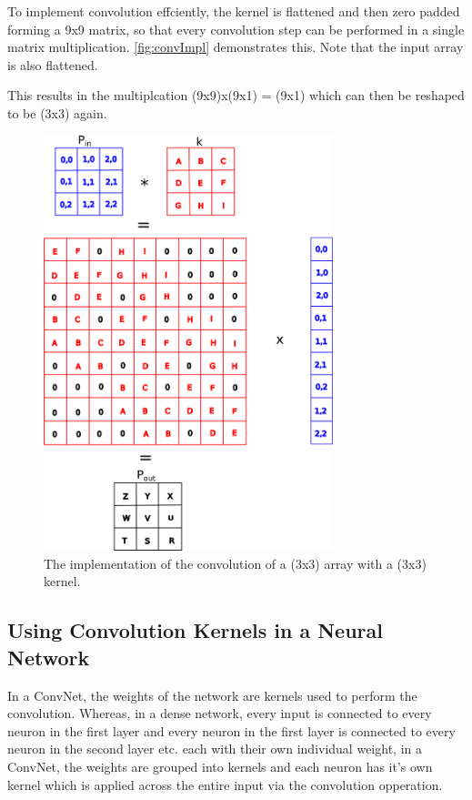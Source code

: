 To implement convolution effciently, the kernel is flattened and then zero padded forming a 9x9 matrix, so that every convolution step can be performed in a single matrix multiplication. \autoref{fig:convImpl} demonstrates this. Note that the input array is also flattened. 

This results in the multiplcation (9x9)x(9x1) = (9x1) which can then be reshaped to be (3x3) again.

\begin{figure}
	\centering	\includegraphics[width=0.75\textwidth]{Figs/intro2dl/convolutionImplementation.png}
	\caption{The implementation of the convolution of a (3x3) array with a (3x3) kernel.}
	\label{fig:convImpl}
\end{figure}

\subsection{Using Convolution Kernels in a Neural Network}
In a ConvNet, the weights of the network are kernels used to perform the convolution. Whereas, in a dense network, every input is connected to every neuron in the first layer and every neuron in the first layer is connected to every neuron in the second layer etc. each with their own individual weight, in a ConvNet, the weights are grouped into kernels and each neuron has it's own kernel which is applied across the entire input via the convolution opperation.

